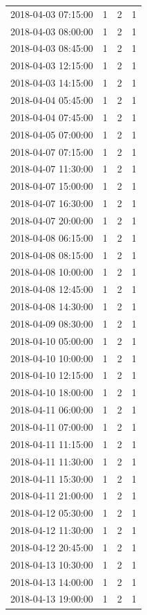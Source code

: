 \begin{tabular}{lrrr}
2018-04-03 07:15:00 & 1 & 2 & 1 \\
2018-04-03 08:00:00 & 1 & 2 & 1 \\
2018-04-03 08:45:00 & 1 & 2 & 1 \\
2018-04-03 12:15:00 & 1 & 2 & 1 \\
2018-04-03 14:15:00 & 1 & 2 & 1 \\
2018-04-04 05:45:00 & 1 & 2 & 1 \\
2018-04-04 07:45:00 & 1 & 2 & 1 \\
2018-04-05 07:00:00 & 1 & 2 & 1 \\
2018-04-07 07:15:00 & 1 & 2 & 1 \\
2018-04-07 11:30:00 & 1 & 2 & 1 \\
2018-04-07 15:00:00 & 1 & 2 & 1 \\
2018-04-07 16:30:00 & 1 & 2 & 1 \\
2018-04-07 20:00:00 & 1 & 2 & 1 \\
2018-04-08 06:15:00 & 1 & 2 & 1 \\
2018-04-08 08:15:00 & 1 & 2 & 1 \\
2018-04-08 10:00:00 & 1 & 2 & 1 \\
2018-04-08 12:45:00 & 1 & 2 & 1 \\
2018-04-08 14:30:00 & 1 & 2 & 1 \\
2018-04-09 08:30:00 & 1 & 2 & 1 \\
2018-04-10 05:00:00 & 1 & 2 & 1 \\
2018-04-10 10:00:00 & 1 & 2 & 1 \\
2018-04-10 12:15:00 & 1 & 2 & 1 \\
2018-04-10 18:00:00 & 1 & 2 & 1 \\
2018-04-11 06:00:00 & 1 & 2 & 1 \\
2018-04-11 07:00:00 & 1 & 2 & 1 \\
2018-04-11 11:15:00 & 1 & 2 & 1 \\
2018-04-11 11:30:00 & 1 & 2 & 1 \\
2018-04-11 15:30:00 & 1 & 2 & 1 \\
2018-04-11 21:00:00 & 1 & 2 & 1 \\
2018-04-12 05:30:00 & 1 & 2 & 1 \\
2018-04-12 11:30:00 & 1 & 2 & 1 \\
2018-04-12 20:45:00 & 1 & 2 & 1 \\
2018-04-13 10:30:00 & 1 & 2 & 1 \\
2018-04-13 14:00:00 & 1 & 2 & 1 \\
2018-04-13 19:00:00 & 1 & 2 & 1 \\

\end{tabular}
